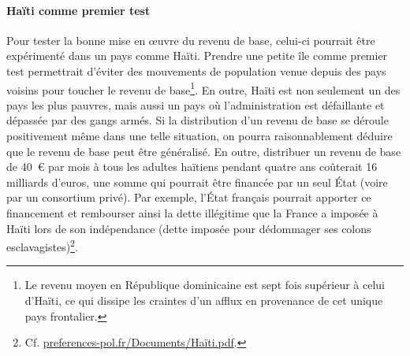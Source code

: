\documentclass[a5paper,french,openany]{memoir}
\begin{document}
\paragraph{Haïti comme premier test}
Pour tester la bonne mise en œuvre du revenu de base, celui-ci pourrait être expérimenté dans un pays comme Haïti. Prendre une petite île comme premier test permettrait d'éviter des mouvements de population venue depuis des pays voisins pour toucher le revenu de base\footnote{Le revenu moyen en République dominicaine est sept fois supérieur à celui d'Haïti, ce qui dissipe les craintes d'un afflux en provenance de cet unique pays frontalier.}. En outre, Haïti est non seulement un des pays les plus pauvres, mais aussi un pays où l'administration est défaillante et dépassée par des gangs armés. Si la distribution d'un revenu de base se déroule positivement même dans une telle situation, on pourra raisonnablement déduire que le revenu de base peut être généralisé. En outre, distribuer un revenu de base de 40~\euro{} par mois à tous les adultes haïtiens pendant quatre ans coûterait 16 milliards d'euros, une somme qui pourrait être financée par un seul État (voire par un consortium privé). %
Par exemple, l'État français pourrait apporter ce financement et rembourser ainsi la dette illégitime que la France a imposée à Haïti lors de son indépendance (dette imposée pour dédommager ses colons esclavagistes)\footnote{Cf. \href{http://preferences-pol.fr/Documents/Haïti.pdf}{preferences-pol.fr/Documents/Haïti.pdf}.}.


\end{document}
